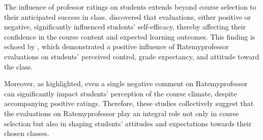 \documentclass[doc,12pt, twocolumn]{apa7}
\begin{document}
The influence of professor ratings on students extends beyond course selection to their anticipated success in class. \textcite{boswell_effects_2020} discovered that evaluations, either positive or negative, significantly influenced students' self-efficacy, thereby affecting their confidence in the course content and expected learning outcomes. This finding is echoed by \textcite{kowai-bell_rate_2011}, which demonstrated a positive influence of Ratemyprofessor evaluations on students' perceived control, grade expectancy, and attitude toward the class.

Moreover, as \textcite{scherr_single_2013} highlighted, even a single negative comment on Ratemyprofessor can significantly impact students' perception of the course climate, despite accompanying positive ratings. Therefore, these studies collectively suggest that the evaluations on Ratemyprofessor play an integral role not only in course selection but also in shaping students' attitudes and expectations towards their chosen classes.










\printbibliography
\end{document}
